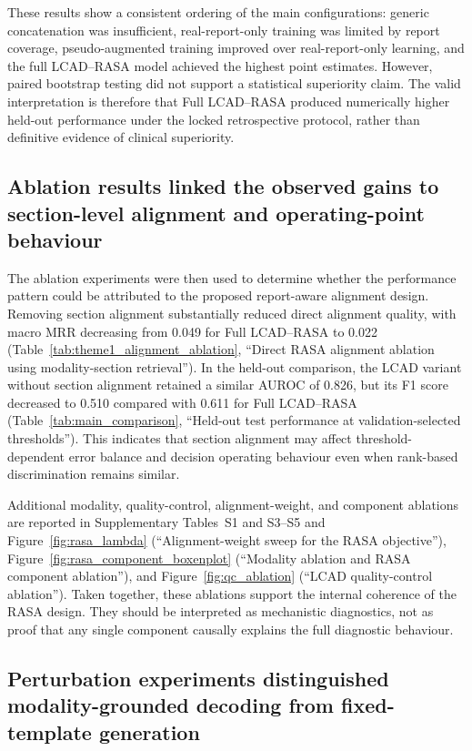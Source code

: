 These results show a consistent ordering of the main configurations: generic concatenation was insufficient, real-report-only training was limited by report coverage, pseudo-augmented training improved over real-report-only learning, and the full LCAD--RASA model achieved the highest point estimates. However, paired bootstrap testing did not support a statistical superiority claim. The valid interpretation is therefore that Full LCAD--RASA produced numerically higher held-out performance under the locked retrospective protocol, rather than definitive evidence of clinical superiority.

\subsection{Ablation results linked the observed gains to section-level alignment and operating-point behaviour}
\label{subsec:ablation_results}

The ablation experiments were then used to determine whether the performance pattern could be attributed to the proposed report-aware alignment design. Removing section alignment substantially reduced direct alignment quality, with macro MRR decreasing from 0.049 for Full LCAD--RASA to 0.022 (Table~\ref{tab:theme1_alignment_ablation}, ``Direct RASA alignment ablation using modality-section retrieval''). In the held-out comparison, the LCAD variant without section alignment retained a similar AUROC of 0.826, but its F1 score decreased to 0.510 compared with 0.611 for Full LCAD--RASA (Table~\ref{tab:main_comparison}, ``Held-out test performance at validation-selected thresholds''). This indicates that section alignment may affect threshold-dependent error balance and decision operating behaviour even when rank-based discrimination remains similar.

Additional modality, quality-control, alignment-weight, and component ablations are reported in Supplementary Tables~S1 and S3--S5 and Figure~\ref{fig:rasa_lambda} (``Alignment-weight sweep for the RASA objective''), Figure~\ref{fig:rasa_component_boxenplot} (``Modality ablation and RASA component ablation''), and Figure~\ref{fig:qc_ablation} (``LCAD quality-control ablation''). Taken together, these ablations support the internal coherence of the RASA design. They should be interpreted as mechanistic diagnostics, not as proof that any single component causally explains the full diagnostic behaviour.

\subsection{Perturbation experiments distinguished modality-grounded decoding from fixed-template generation}
\label{subsec:perturbation_results}

